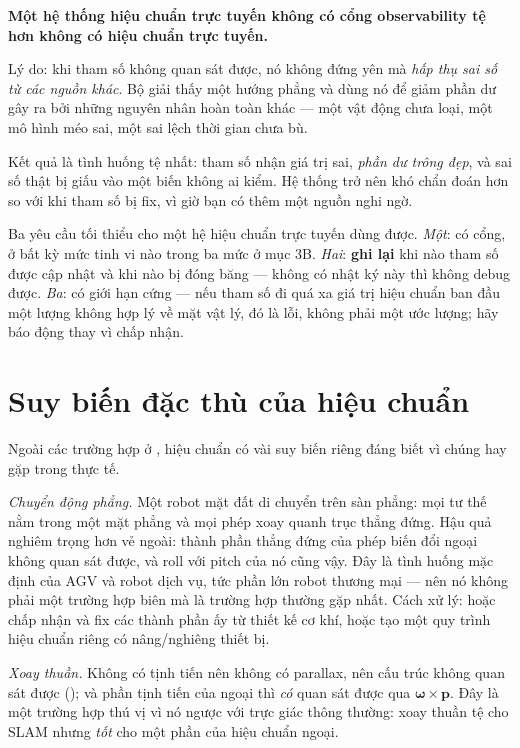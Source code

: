 \documentclass[../../vslam.tex]{subfiles}
\begin{document}
\begin{cambay}
\textbf{Một hệ thống hiệu chuẩn trực tuyến không có cổng observability tệ hơn không có hiệu chuẩn trực tuyến.}

Lý do: khi tham số không quan sát được, nó không đứng yên mà \emph{hấp thụ sai số từ các nguồn khác}. Bộ giải thấy một hướng phẳng và dùng nó để giảm phần dư gây ra bởi những nguyên nhân hoàn toàn khác --- một vật động chưa loại, một mô hình méo sai, một sai lệch thời gian chưa bù.

Kết quả là tình huống tệ nhất: tham số nhận giá trị sai, \emph{phần dư trông đẹp}, và sai số thật bị giấu vào một biến không ai kiểm. Hệ thống trở nên khó chẩn đoán hơn so với khi tham số bị fix, vì giờ bạn có thêm một nguồn nghi ngờ.

Ba yêu cầu tối thiểu cho một hệ hiệu chuẩn trực tuyến dùng được. \emph{Một}: có cổng, ở bất kỳ mức tinh vi nào trong ba mức ở mục 3B. \emph{Hai}: \textbf{ghi lại} khi nào tham số được cập nhật và khi nào bị đóng băng --- không có nhật ký này thì không debug được. \emph{Ba}: có giới hạn cứng --- nếu tham số đi quá xa giá trị hiệu chuẩn ban đầu một lượng không hợp lý về mặt vật lý, đó là lỗi, không phải một ước lượng; hãy báo động thay vì chấp nhận.
\end{cambay}

\section{Suy biến đặc thù của hiệu chuẩn}

Ngoài các trường hợp ở , hiệu chuẩn có vài suy biến riêng đáng biết vì chúng hay gặp trong thực tế.

\emph{Chuyển động phẳng.} Một robot mặt đất di chuyển trên sàn phẳng: mọi tư thế nằm trong một mặt phẳng và mọi phép xoay quanh trục thẳng đứng. Hậu quả nghiêm trọng hơn vẻ ngoài: thành phần thẳng đứng của phép biến đổi ngoại không quan sát được, và roll với pitch của nó cũng vậy. Đây là tình huống mặc định của AGV và robot dịch vụ, tức phần lớn robot thương mại --- nên nó không phải một trường hợp biên mà là trường hợp thường gặp nhất. Cách xử lý: hoặc chấp nhận và fix các thành phần ấy từ thiết kế cơ khí, hoặc tạo một quy trình hiệu chuẩn riêng có nâng/nghiêng thiết bị.

\emph{Xoay thuần.} Không có tịnh tiến nên không có parallax, nên cấu trúc không quan sát được (); và phần tịnh tiến của ngoại thì \emph{có} quan sát được qua \(\boldsymbol{\omega}\times\mathbf{p}\). Đây là một trường hợp thú vị vì nó ngược với trực giác thông thường: xoay thuần tệ cho SLAM nhưng \emph{tốt} cho một phần của hiệu chuẩn ngoại.
\end{document}
